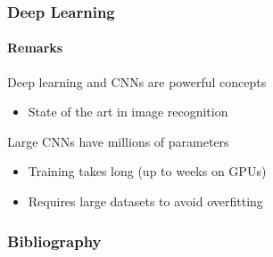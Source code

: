 \documentclass[xetex,professionalfont]{beamer}
\let\oldemph\emph
\renewcommand\emph[1]{\textcolor{tuwcvl_inf_red}{#1}}
\begin{document}

\begin{frame}
\frametitle{Deep Learning}
\framesubtitle{Remarks}

Deep learning and CNNs are powerful concepts
\begin{itemize}
    \item State of the art in image recognition
\end{itemize}

\bigskip
Large CNNs have millions of parameters
\begin{itemize}
    \item Training takes long (up to weeks on GPUs)
    \item Requires large datasets to avoid overfitting
\end{itemize}

\end{frame}


\renewcommand\emph[1]{\oldemph{#1}}

\begin{frame}[allowframebreaks=0.8]
\frametitle{Bibliography}

\printbibliography

\end{frame}
\end{document}
